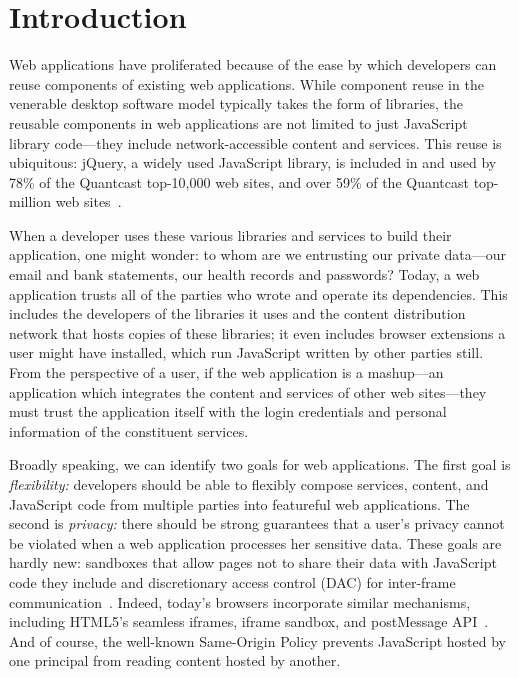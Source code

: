 \section{Introduction}
\label{sec:intro}

Web applications have proliferated because of the ease by which
developers can reuse components of existing web applications.
%
While component reuse in the venerable desktop software model typically
takes the form of libraries, the reusable components in web applications
are not limited to just JavaScript library code---they include
network-accessible content and services.
%
This reuse is ubiquitous\@: jQuery, a widely used JavaScript
library, is included in and used by 78\% of the Quantcast top-10,000
web sites, and over 59\% of the Quantcast top-million web
sites~\cite{quantcast}.

When a developer uses these various libraries and services to build
their application, one might wonder: to whom are we entrusting our
private data---our email and bank statements, our health records and
passwords?
%
Today, a web application trusts all of the parties who wrote and
operate its dependencies.
%
This includes the developers of the libraries it uses and the content
distribution network that hosts copies of these libraries; it even
includes browser extensions a user might have installed, which run
JavaScript written by other parties still.
%
From the perspective of a user, if the web application is a mashup---an
application which integrates the content and services of other web
sites---they must trust the application itself with the login
credentials and personal information of the constituent services.

 Broadly speaking, we can identify two goals for web applications.
%
The first goal is {\em flexibility:\/} developers should be able to
flexibly compose services, content, and JavaScript code from multiple
parties into featureful web applications.
%
The second is {\em privacy:\/} there should be strong guarantees that a
user's privacy cannot be violated when a web application processes her
sensitive data.
%
These goals are hardly new: 
sandboxes that allow pages not to share their data with JavaScript code
they include and discretionary access control (DAC) for inter-frame
communication~\cite{mashupos}.
%
Indeed, today's browsers incorporate similar mechanisms, including
HTML5's seamless iframes, iframe sandbox, and postMessage
API~\cite{html5}.
%
And of course, the well-known Same-Origin Policy prevents JavaScript
hosted by one principal from reading content hosted by another.

